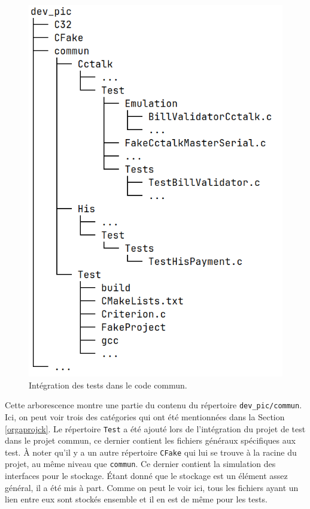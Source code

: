 \documentclass[a4paper]{article}
\begin{document}
\begin{figure}[h!]
  \begin{center}
    \includegraphics[scale=0.4]{./img/arborescence-commun.png}
    \caption{Intégration des tests dans le code commun.}
    \label{fig:integrtestcommun}
  \end{center}
\end{figure}

Cette arborescence montre une partie du contenu du répertoire
\verb|dev_pic/commun|. Ici, on peut voir trois des catégories qui ont été
mentionnées dans la Section \ref{orgaprojck}. Le répertoire \verb|Test| a été
ajouté lors de l'intégration du projet de test dans le projet commun, ce dernier
contient les fichiers généraux spécifiques aux test. À noter qu'il y a un autre
répertoire \verb|CFake| qui lui se trouve à la racine du projet, au même niveau
que \verb|commun|. Ce dernier contient la simulation des interfaces pour le
stockage. Étant donné que le stockage est un élément assez général, il a été mis
à part. Comme on peut le voir ici, tous les fichiers ayant un lien entre eux
sont stockés ensemble et il en est de même pour les tests.
\end{document}
